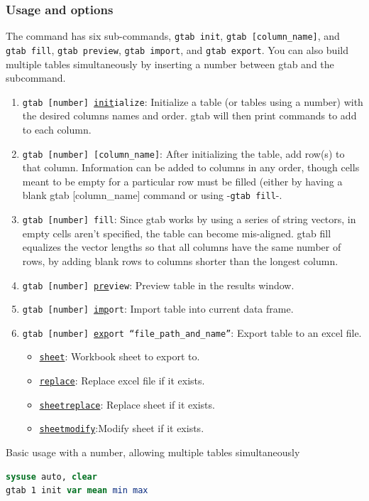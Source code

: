{\subsubsection{Usage and options}
The command has six sub-commands, \texttt{gtab init}, \texttt{gtab [column\_name]}, and \texttt{gtab fill}, \texttt{gtab preview}, \texttt{gtab import}, and \texttt{gtab export}. You can also build multiple tables simultaneously by inserting a number between gtab and the subcommand.
\begin{enumerate}
\item \texttt{gtab [number] \underline{init}ialize}: Initialize a table (or tables using a number) with the desired columns names and order. gtab will then print commands to add to each column.
\item \texttt{gtab [number] [column\_name]}: After initializing the table, add row(s) to that column. Information can be added to columns in any order, though cells meant to be empty for a particular row must be filled (either by having a blank gtab [column\_name] command or using -\texttt{gtab fill}-.
\item \texttt{gtab [number] fill}: Since gtab works by using a series of string vectors, in empty cells aren't specified, the table can become mis-aligned. gtab fill equalizes the vector lengths so that all columns have the same number of rows, by adding blank rows to columns shorter than the longest column.
\item \texttt{gtab [number] \underline{pre}view}: Preview table in the results window.
\item \texttt{gtab [number] \underline{imp}ort}: Import table into current data frame.
\item \texttt{gtab [number] \underline{exp}ort ``file\_path\_and\_name''}: Export table to an excel file.
\begin{itemize}
\item \texttt{\underline{sheet}}: Workbook sheet to export to.
\item \texttt{\underline{replace}}: Replace excel file if it exists.
\item \texttt{\underline{sheetreplace}}: Replace sheet if it exists.
\item \texttt{\underline{sheetmodify}}:Modify sheet if it exists.
\end{itemize}

\end{enumerate}

Basic usage with a number, allowing multiple tables simultaneously
\begin{lstlisting}[language=Stata, numbers=none]
sysuse auto, clear
gtab 1 init var mean min max


\end{lstlisting}}
